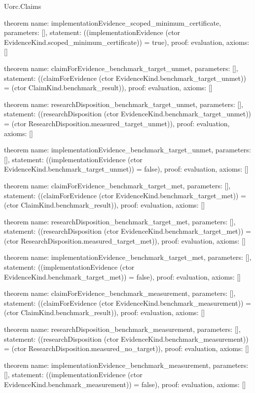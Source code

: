 \begin{lexlean}{Uorc.Claims}
\begin{semanticmodule}
theorem{
  name: implementationEvidence_scoped_minimum_certificate,
  parameters: [],
  statement: ((implementationEvidence (ctor EvidenceKind.scoped_minimum_certificate)) = true),
  proof: evaluation{},
  axioms: []
}

theorem{
  name: claimForEvidence_benchmark_target_unmet,
  parameters: [],
  statement: ((claimForEvidence (ctor EvidenceKind.benchmark_target_unmet)) = (ctor ClaimKind.benchmark_result)),
  proof: evaluation{},
  axioms: []
}

theorem{
  name: researchDisposition_benchmark_target_unmet,
  parameters: [],
  statement: ((researchDisposition (ctor EvidenceKind.benchmark_target_unmet)) = (ctor ResearchDisposition.measured_target_unmet)),
  proof: evaluation{},
  axioms: []
}

theorem{
  name: implementationEvidence_benchmark_target_unmet,
  parameters: [],
  statement: ((implementationEvidence (ctor EvidenceKind.benchmark_target_unmet)) = false),
  proof: evaluation{},
  axioms: []
}

theorem{
  name: claimForEvidence_benchmark_target_met,
  parameters: [],
  statement: ((claimForEvidence (ctor EvidenceKind.benchmark_target_met)) = (ctor ClaimKind.benchmark_result)),
  proof: evaluation{},
  axioms: []
}

theorem{
  name: researchDisposition_benchmark_target_met,
  parameters: [],
  statement: ((researchDisposition (ctor EvidenceKind.benchmark_target_met)) = (ctor ResearchDisposition.measured_target_met)),
  proof: evaluation{},
  axioms: []
}

theorem{
  name: implementationEvidence_benchmark_target_met,
  parameters: [],
  statement: ((implementationEvidence (ctor EvidenceKind.benchmark_target_met)) = false),
  proof: evaluation{},
  axioms: []
}

theorem{
  name: claimForEvidence_benchmark_measurement,
  parameters: [],
  statement: ((claimForEvidence (ctor EvidenceKind.benchmark_measurement)) = (ctor ClaimKind.benchmark_result)),
  proof: evaluation{},
  axioms: []
}

theorem{
  name: researchDisposition_benchmark_measurement,
  parameters: [],
  statement: ((researchDisposition (ctor EvidenceKind.benchmark_measurement)) = (ctor ResearchDisposition.measured_no_target)),
  proof: evaluation{},
  axioms: []
}

theorem{
  name: implementationEvidence_benchmark_measurement,
  parameters: [],
  statement: ((implementationEvidence (ctor EvidenceKind.benchmark_measurement)) = false),
  proof: evaluation{},
  axioms: []
}


\end{semanticmodule}
\end{lexlean}

